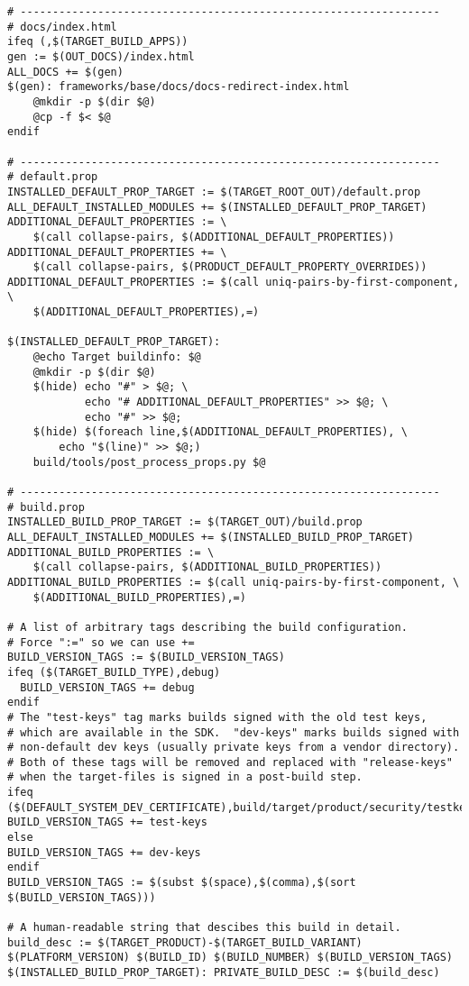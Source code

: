 \documentclass[12pt,a4paper]{article}
\begin{document}
\begin{verbatim}
# -----------------------------------------------------------------
# docs/index.html
ifeq (,$(TARGET_BUILD_APPS))
gen := $(OUT_DOCS)/index.html
ALL_DOCS += $(gen)
$(gen): frameworks/base/docs/docs-redirect-index.html
	@mkdir -p $(dir $@)
	@cp -f $< $@
endif

# -----------------------------------------------------------------
# default.prop
INSTALLED_DEFAULT_PROP_TARGET := $(TARGET_ROOT_OUT)/default.prop
ALL_DEFAULT_INSTALLED_MODULES += $(INSTALLED_DEFAULT_PROP_TARGET)
ADDITIONAL_DEFAULT_PROPERTIES := \
    $(call collapse-pairs, $(ADDITIONAL_DEFAULT_PROPERTIES))
ADDITIONAL_DEFAULT_PROPERTIES += \
    $(call collapse-pairs, $(PRODUCT_DEFAULT_PROPERTY_OVERRIDES))
ADDITIONAL_DEFAULT_PROPERTIES := $(call uniq-pairs-by-first-component, \
    $(ADDITIONAL_DEFAULT_PROPERTIES),=)

$(INSTALLED_DEFAULT_PROP_TARGET):
	@echo Target buildinfo: $@
	@mkdir -p $(dir $@)
	$(hide) echo "#" > $@; \
	        echo "# ADDITIONAL_DEFAULT_PROPERTIES" >> $@; \
	        echo "#" >> $@;
	$(hide) $(foreach line,$(ADDITIONAL_DEFAULT_PROPERTIES), \
		echo "$(line)" >> $@;)
	build/tools/post_process_props.py $@

# -----------------------------------------------------------------
# build.prop
INSTALLED_BUILD_PROP_TARGET := $(TARGET_OUT)/build.prop
ALL_DEFAULT_INSTALLED_MODULES += $(INSTALLED_BUILD_PROP_TARGET)
ADDITIONAL_BUILD_PROPERTIES := \
    $(call collapse-pairs, $(ADDITIONAL_BUILD_PROPERTIES))
ADDITIONAL_BUILD_PROPERTIES := $(call uniq-pairs-by-first-component, \
    $(ADDITIONAL_BUILD_PROPERTIES),=)

# A list of arbitrary tags describing the build configuration.
# Force ":=" so we can use +=
BUILD_VERSION_TAGS := $(BUILD_VERSION_TAGS)
ifeq ($(TARGET_BUILD_TYPE),debug)
  BUILD_VERSION_TAGS += debug
endif
# The "test-keys" tag marks builds signed with the old test keys,
# which are available in the SDK.  "dev-keys" marks builds signed with
# non-default dev keys (usually private keys from a vendor directory).
# Both of these tags will be removed and replaced with "release-keys"
# when the target-files is signed in a post-build step.
ifeq ($(DEFAULT_SYSTEM_DEV_CERTIFICATE),build/target/product/security/testkey)
BUILD_VERSION_TAGS += test-keys
else
BUILD_VERSION_TAGS += dev-keys
endif
BUILD_VERSION_TAGS := $(subst $(space),$(comma),$(sort $(BUILD_VERSION_TAGS)))

# A human-readable string that descibes this build in detail.
build_desc := $(TARGET_PRODUCT)-$(TARGET_BUILD_VARIANT) $(PLATFORM_VERSION) $(BUILD_ID) $(BUILD_NUMBER) $(BUILD_VERSION_TAGS)
$(INSTALLED_BUILD_PROP_TARGET): PRIVATE_BUILD_DESC := $(build_desc)


\end{verbatim}
\end{document}
